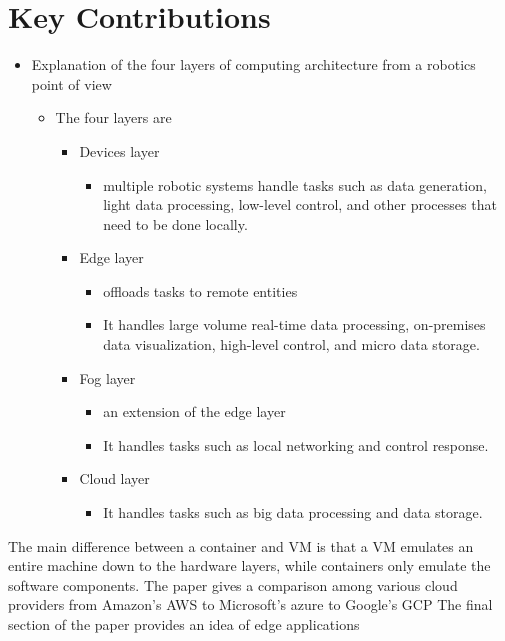 \documentclass{article}
\begin{document}
\section{Key Contributions}
\begin{itemize}
\item Explanation of the four layers of computing architecture from a robotics point of view
    \begin{itemize}
    \item The four layers are
        \begin{itemize}
        \item Devices layer
            \begin{itemize}
            \item multiple robotic systems handle tasks such as data generation, light data processing, low-level control, and other processes that need to be done locally.
            \end{itemize}
        \item Edge layer
            \begin{itemize}
            \item offloads tasks to remote entities
            \item It handles large volume real-time data processing, on-premises data visualization, high-level control, and micro data storage.
            \end{itemize}
        \item Fog layer
            \begin{itemize}
            \item an extension of the edge layer
            \item It handles tasks such as local networking and control response.
            \end{itemize}
        \item Cloud layer
            \begin{itemize}
            \item It handles tasks such as big data processing and data storage.
            \end{itemize}
        \end{itemize}
        \end{itemize}
\end{itemize}
 The main difference between a container and VM is that a VM emulates an entire machine down to the hardware layers, while containers only emulate the software components. The paper gives  a comparison among various cloud providers from Amazon's AWS to Microsoft's azure to Google's GCP
 The final section of the paper provides an idea of edge applications
\end{document}
